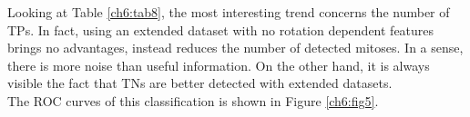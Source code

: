 Looking at Table \ref{ch6:tab8}, the most interesting trend concerns the number of \Glspl{TP}. In fact, using an extended dataset with no rotation dependent features
brings no advantages, instead reduces the number of detected mitoses. In a sense, there is more noise than useful information. On the other hand, it is always visible 
the fact that \Glspl{TN} are better detected with extended datasets.\\
The \Gls{ROC} curves of this classification is shown in Figure \ref{ch6:fig5}.

\begin{figure}[!htb]
  \centering
    \hspace{1mm}
    \\
    \hspace{1mm}

\end{figure}
